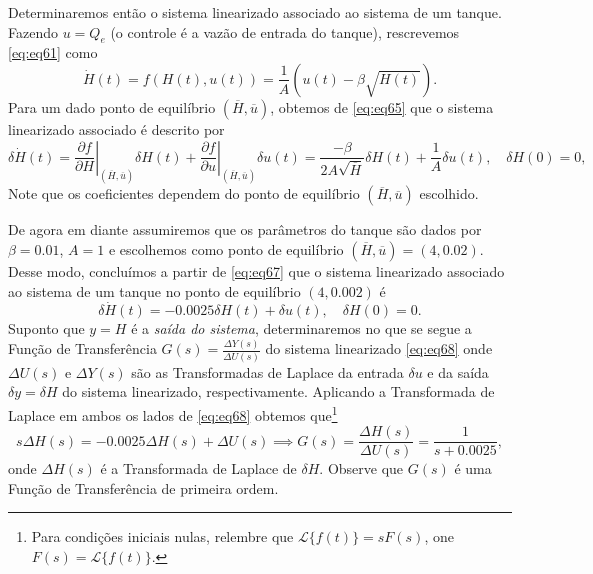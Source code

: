 \documentclass[
]{book}
\theoremstyle{definition}
\theoremstyle{definition}
\theoremstyle{definition}
\theoremstyle{remark}
\begin{document}
Determinaremos então o sistema linearizado associado ao sistema de um tanque. Fazendo \(u = Q_e\) (o controle é a vazão de entrada do tanque), rescrevemos \eqref{eq:eq61} como
\[
\dot{H}(t) = f(H(t),u(t)) = \frac{1}{A}(u(t) - \beta\sqrt{H(t)}). \label{eq:eq66}
\]
Para um dado ponto de equilíbrio \((\overline{H}, \overline{u})\), obtemos de \eqref{eq:eq65} que o sistema linearizado associado é descrito por
\[
\delta\dot{H}(t) = \left.\frac{\partial f}{\partial H}\right|_{(\overline{H}, \overline{u})}\delta H(t) + \left.\frac{\partial f}{\partial u}\right|_{(\overline{H}, \overline{u})}\delta u(t) = \boxed{\frac{-\beta}{2A\sqrt{\overline{H}}}\delta H(t) + \frac{1}{A} \delta u(t), \quad \delta H(0) = 0},\label{eq:eq67}
\]
Note que os coeficientes dependem do ponto de equilíbrio \((\overline{H}, \overline{u})\) escolhido.

De agora em diante assumiremos que os parâmetros do tanque são dados por \(\beta = 0.01\), \(A = 1\) e escolhemos como ponto de equilíbrio \((\overline{H}, \overline{u}) = (4, 0.02)\). Desse modo, concluímos a partir de \eqref{eq:eq67} que o sistema linearizado associado ao sistema de um tanque no ponto de equilíbrio \((4, 0.002)\) é
\[
\delta\dot{H}(t) = -0.0025\delta H(t) + \delta u(t), \quad \delta H(0) = 0. \label{eq:eq68}
\]
Suponto que \(y = H\) é a \emph{saída do sistema}, determinaremos no que se segue a Função de Transferência \(G(s) = \frac{\Delta Y(s)}{\Delta U(s)}\) do sistema linearizado \eqref{eq:eq68} onde \(\Delta U(s)\) e \(\Delta Y(s)\) são as Transformadas de Laplace da entrada \(\delta u\) e da saída \(\delta y = \delta H\) do sistema linearizado, respectivamente. Aplicando a Transformada de Laplace em ambos os lados de \eqref{eq:eq68} obtemos que\footnote{Para condições iniciais nulas, relembre que \(\mathcal{L}\{f(t)\} = sF(s)\), one \(F(s) = \mathcal{L}\{f(t)\}\).}
\[
s\Delta H(s) = - 0.0025\Delta H(s) + \Delta U(s) \implies \boxed{G(s) = \frac{\Delta H(s)}{\Delta U(s)} = \frac{1}{s + 0.0025}}, \label{eq:eq69}
\]
onde \(\Delta H(s)\) é a Transformada de Laplace de \(\delta H\). Observe que \(G(s)\) é uma Função de Transferência de primeira ordem.
\end{document}
